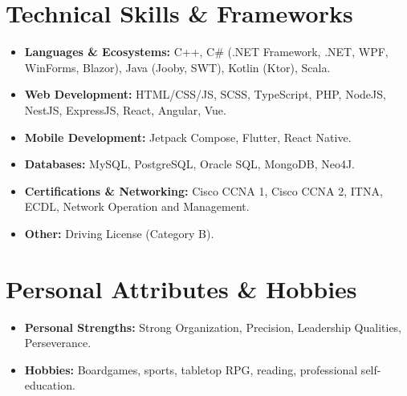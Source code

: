 \documentclass[11pt,a4paper]{article}
\begin{document}
\section{Technical Skills \& Frameworks}
\begin{itemize}[leftmargin=0, label={}]
    \item \textbf{Languages \& Ecosystems:} C++, C\# (.NET Framework, .NET, WPF, WinForms, Blazor), Java (Jooby, SWT), Kotlin (Ktor), Scala.
    \item \textbf{Web Development:} HTML/CSS/JS, SCSS, TypeScript, PHP, NodeJS, NestJS, ExpressJS, React, Angular, Vue.
    \item \textbf{Mobile Development:} Jetpack Compose, Flutter, React Native.
    \item \textbf{Databases:} MySQL, PostgreSQL, Oracle SQL, MongoDB, Neo4J.
    \item \textbf{Certifications \& Networking:} Cisco CCNA 1, Cisco CCNA 2, ITNA, ECDL, Network Operation and Management.
    \item \textbf{Other:} Driving License (Category B).
\end{itemize}

\section{Personal Attributes \& Hobbies}
\begin{itemize}[leftmargin=0, label={}]
    \item \textbf{Personal Strengths:} Strong Organization, Precision, Leadership Qualities, Perseverance. 
    \item \textbf{Hobbies:} Boardgames, sports, tabletop RPG, reading, professional self-education.
\end{itemize}
\end{document}
